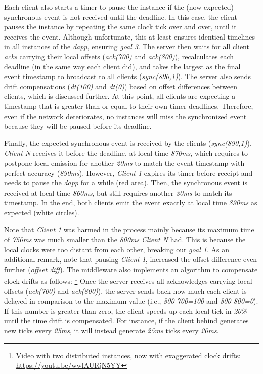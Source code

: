 \documentclass[sigplan,screen]{acmart}
\newcommand{\dapp}{\emph{dapp}\xspace}
\begin{document}
Each client also starts a timer to pause the instance if the (now expected)
synchronous event is not received until the deadline.
In this case, the client pauses the instance by repeating the same clock tick
over and over, until it receives the event.
Although unfortunate, this at least ensures identical timelines in all
instances of the \dapp, ensuring \emph{goal 3}.
%
The server then waits for all client \emph{acks} carrying their local offsets
(\emph{ack(700)} and \emph{ack(800)}), recalculates each deadline (in the same
way each client did), and takes the largest as the final event timestamp to
broadcast to all clients (\emph{sync(890,1)}).
The server also sends drift compensations (\emph{dt(100)} and \emph{dt(0)})
based on offset differences between clients, which is discussed further.
At this point, all clients are expecting a timestamp that is greater than or
equal to their own timer deadlines.
Therefore, even if the network deteriorates, no instances will miss the
synchronized event because they will be paused before its deadline.

Finally, the expected synchronous event is received by the clients
(\emph{sync(890,1)}).
\emph{Client N} receives it before the deadline, at local time \emph{870ms},
which requires to postpone local emission for another \emph{20ms} to match the
event timestamp with perfect accuracy (\emph{890ms}).
However, \emph{Client 1} expires its timer before receipt and needs to pause
the \dapp for a while (red area).
Then, the synchronous event is received at local time \emph{860ms}, but still
requires another \emph{30ms} to match its timestamp.
In the end, both clients emit the event exactly at local time \emph{890ms} as
expected (white circles).

Note that \emph{Client 1} was harmed in the process mainly because its maximum
time of \emph{750ms} was much smaller than the \emph{800ms} \emph{Client N}
had.
This is because the local clocks were too distant from each other, breaking our
\emph{goal 1}.
As an additional remark, note that pausing \emph{Client 1}, increased the
offset difference even further (\emph{offset diff}).
%
The middleware also implements an algorithm to compensate clock drifts as
follows:%
\footnote {
    Video with two distributed instances, now with exaggerated clock drifts:
    \url{https://youtu.be/wwlAURjN5YY}
}
Once the server receives all acknowledges carrying local offsets
(\emph{ack(700)} and \emph{ack(800)}), the server sends back how much each
client is delayed in comparison to the maximum value (i.e., \emph{800-700=100}
and \emph{800-800=0}).
If this number is greater than zero, the client speeds up each local tick in
\emph{20\%} until the time drift is compensated.
For instance, if the client behind generates new ticks every \emph{25ms}, it
will instead generate \emph{25ms} ticks every \emph{20ms}.
\end{document}
